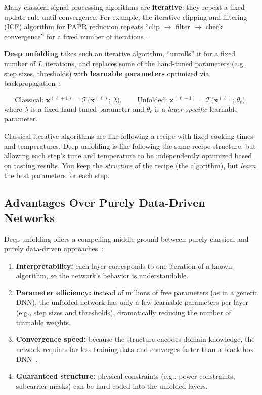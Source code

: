 Many classical signal processing algorithms are \textbf{iterative}:
they repeat a fixed update rule until convergence.
For example, the iterative clipping-and-filtering (ICF) algorithm for
PAPR reduction repeats ``clip $\to$ filter $\to$ check convergence''
for a fixed number of iterations~\cite{nguyen2022deep}.

\textbf{Deep unfolding} takes such an iterative algorithm, ``unrolls'' it
for a fixed number of $L$ iterations, and replaces some of the hand-tuned
parameters (e.g., step sizes, thresholds) with \textbf{learnable parameters}
optimized via backpropagation~\cite{nguyen2022deep}:

\begin{equation}
    \text{Classical: } \bm{x}^{(\ell+1)} = \mathcal{T}\!\bigl(\bm{x}^{(\ell)};\,\lambda\bigr),
    \qquad
    \text{Unfolded: } \bm{x}^{(\ell+1)} = \mathcal{T}\!\bigl(\bm{x}^{(\ell)};\,\theta_\ell\bigr),
    \label{eq:unfolding}
\end{equation}
where $\lambda$ is a fixed hand-tuned parameter and $\theta_\ell$ is a
\emph{layer-specific} learnable parameter.

\begin{workingexample}
    Classical iterative algorithms are like following a recipe with
    fixed cooking times and temperatures.  Deep unfolding is like
    following the same recipe structure, but allowing each step's
    time and temperature to be independently optimized based on
    tasting results.  You keep the \emph{structure} of the recipe
    (the algorithm), but \emph{learn} the best parameters for each step.
\end{workingexample}

\subsection{Advantages Over Purely Data-Driven Networks}

Deep unfolding offers a compelling middle ground between purely
classical and purely data-driven approaches~\cite{nguyen2022deep}:

\begin{enumerate}
    \item \textbf{Interpretability:} each layer corresponds to one iteration
          of a known algorithm, so the network's behavior is understandable.
    \item \textbf{Parameter efficiency:} instead of millions of free parameters
          (as in a generic DNN), the unfolded network has only a few
          learnable parameters per layer (e.g., step sizes and thresholds),
          dramatically reducing the number of trainable weights.
    \item \textbf{Convergence speed:} because the structure encodes domain
          knowledge, the network requires far less training data and
          converges faster than a black-box DNN~\cite{nguyen2022deep}.
    \item \textbf{Guaranteed structure:} physical constraints
          (e.g., power constraints, subcarrier masks) can be
          hard-coded into the unfolded layers.
\end{enumerate}


